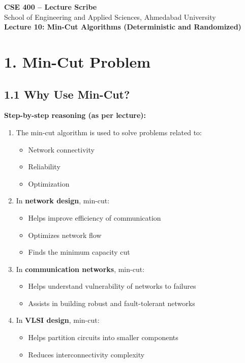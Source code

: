 \documentclass[11pt]{article}
\begin{document}
\begin{center}
    {\Large \textbf{CSE 400 – Lecture Scribe}}\\[0.2cm]
    {\normalsize School of Engineering and Applied Sciences, Ahmedabad University}\\[0.3cm]
    {\large \textbf{Lecture 10: Min-Cut Algorithms (Deterministic and Randomized)}}
\end{center}

\vspace{0.4cm}

\section*{1. Min-Cut Problem}

\subsection*{1.1 Why Use Min-Cut?}

\textbf{Step-by-step reasoning (as per lecture):}
\begin{enumerate}
    \item The min-cut algorithm is used to solve problems related to:
    \begin{itemize}
        \item Network connectivity
        \item Reliability
        \item Optimization
    \end{itemize}
    \item In \textbf{network design}, min-cut:
    \begin{itemize}
        \item Helps improve efficiency of communication
        \item Optimizes network flow
        \item Finds the minimum capacity cut
    \end{itemize}
    \item In \textbf{communication networks}, min-cut:
    \begin{itemize}
        \item Helps understand vulnerability of networks to failures
        \item Assists in building robust and fault-tolerant networks
    \end{itemize}
    \item In \textbf{VLSI design}, min-cut:
    \begin{itemize}
        \item Helps partition circuits into smaller components
        \item Reduces interconnectivity complexity
    \end{itemize}
\end{enumerate}
\end{document}
